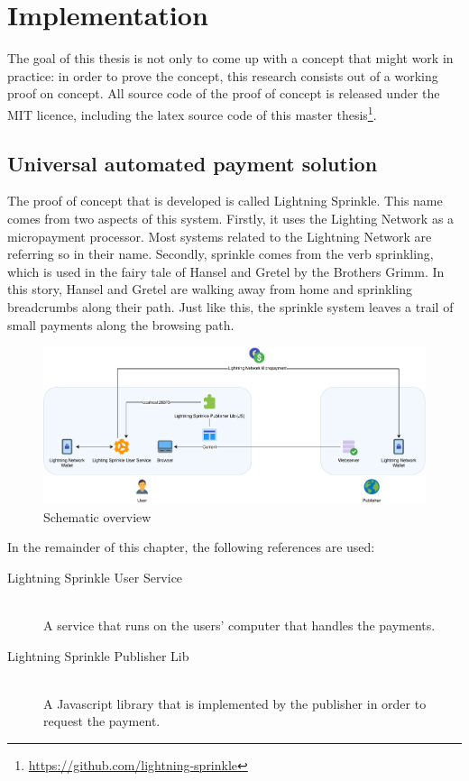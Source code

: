 \chapter{Implementation}
\label{cha:implementation}

The goal of this thesis is not only to come up with a concept that might work in practice: in order to prove the concept, this research consists out of a working proof on concept. All source code of the proof of concept is released under the MIT licence, including the latex source code of this master thesis\footnote{\url{https://github.com/lightning-sprinkle}}.

\section{Universal automated payment solution}
The proof of concept that is developed is called Lightning Sprinkle. This name comes from two aspects of this system. Firstly, it uses the Lighting Network as a micropayment processor. Most systems related to the Lightning Network are referring so in their name. Secondly, sprinkle comes from the verb sprinkling, which is used in the fairy tale of Hansel and Gretel by the Brothers Grimm. In this story, Hansel and Gretel are walking away from home and sprinkling breadcrumbs along their path. Just like this, the sprinkle system leaves a trail of small payments along the browsing path.
\begin{figure}[h!]
  \includegraphics[width=\textwidth]{images/implementation.pdf}
  \caption{Schematic overview}
\end{figure}
In the remainder of this chapter, the following references are used:

\begin{description}
  \item[Lightning Sprinkle User Service] \hfill \\ A service that runs on the users' computer that handles the payments.
  \item[Lightning Sprinkle Publisher Lib] \hfill \\ A Javascript library that is implemented by the publisher in order to request the payment.
\end{description} 

